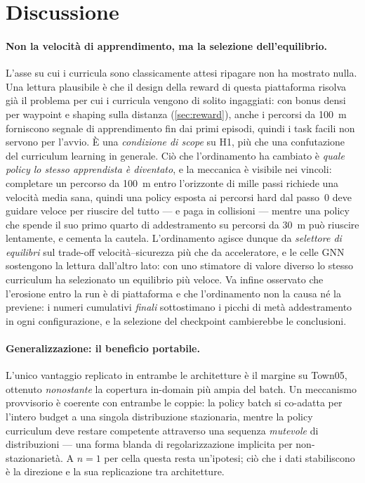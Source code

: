 \section{Discussione}
\label{sec:discussione}

\paragraph{Non la velocità di apprendimento, ma la selezione dell'equilibrio.}
L'asse su cui i curricula sono classicamente attesi ripagare non ha
mostrato nulla. Una lettura plausibile è che il design della reward di
questa piattaforma risolva già il problema per cui i curricula vengono
di solito ingaggiati: con bonus densi per waypoint e shaping sulla
distanza (\cref{sec:reward}), anche i percorsi da \SI{100}{m}
forniscono segnale di apprendimento fin dai primi episodi, quindi i task
facili non servono per l'avvio. È una \emph{condizione di scope} su H1,
più che una confutazione del curriculum learning in generale. Ciò che
l'ordinamento ha cambiato è \emph{quale policy lo stesso apprendista è
diventato}, e la meccanica è visibile nei vincoli: completare un
percorso da \SI{100}{m} entro l'orizzonte di mille passi richiede una
velocità media sana, quindi una policy esposta ai percorsi hard dal
passo~0 deve guidare veloce per riuscire del tutto --- e paga in
collisioni --- mentre una policy che spende il suo primo quarto di
addestramento su percorsi da \SI{30}{m} può riuscire lentamente, e
cementa la cautela. L'ordinamento agisce dunque da \emph{selettore di
equilibri} sul trade-off velocità--sicurezza più che da acceleratore, e
le celle GNN sostengono la lettura dall'altro lato: con uno stimatore di
valore diverso lo stesso curriculum ha selezionato un equilibrio più
veloce. Va infine osservato che l'erosione entro la run è di piattaforma
e che l'ordinamento non la causa né la previene: i numeri cumulativi
\emph{finali} sottostimano i picchi di metà addestramento in ogni
configurazione, e la selezione del checkpoint cambierebbe le
conclusioni.

\paragraph{Generalizzazione: il beneficio portabile.}
L'unico vantaggio replicato in entrambe le architetture è il margine su
Town05, ottenuto \emph{nonostante} la copertura in-domain più ampia del
batch. Un meccanismo provvisorio è coerente con entrambe le coppie: la
policy batch si co-adatta per l'intero budget a una singola
distribuzione stazionaria, mentre la policy curriculum deve restare
competente attraverso una sequenza \emph{mutevole} di distribuzioni ---
una forma blanda di regolarizzazione implicita per non-stazionarietà. A
$n{=}1$ per cella questa resta un'ipotesi; ciò che i dati stabiliscono è
la direzione e la sua replicazione tra architetture.

